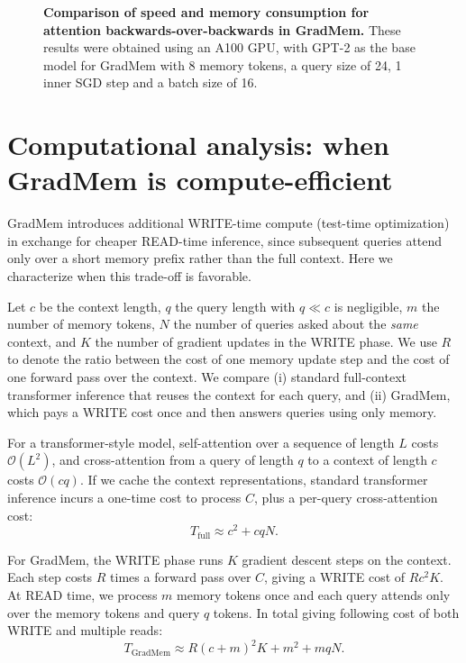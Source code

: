 \documentclass{article}
\theoremstyle{plain}
\theoremstyle{definition}
\theoremstyle{remark}
\begin{document}
{\begin{figure}[htbp!]
  \caption{\textbf{Comparison of speed and memory consumption for attention backwards-over-backwards in GradMem.} These results were obtained using an A100 GPU, with GPT-2 as the base model for GradMem with 8 memory tokens, a query size of 24, 1 inner SGD step and a batch size of 16.}
  \label{fig:gradmem_sdpa}
\end{figure}

\section{Computational analysis: when GradMem is compute-efficient}
\label{sec:compute_analysis}

GradMem introduces additional WRITE-time compute (test-time optimization) in exchange for cheaper READ-time inference, since subsequent queries attend only over a short memory prefix rather than the full context.
Here we characterize when this trade-off is favorable.

Let $c$ be the context length, $q$ the query length with $q \ll c$ is negligible, $m$ the number of memory tokens, $N$ the number of queries asked about the \emph{same} context, and $K$ the number of gradient updates in the WRITE phase.
We use $R$ to denote the ratio between the cost of one memory update step and the cost of one forward pass over the context. We compare (i) standard full-context transformer inference that reuses the context for each query, and (ii) GradMem, which pays a WRITE cost once and then answers queries using only memory.

For a transformer-style model, self-attention over a sequence of length $L$ costs $\mathcal{O}(L^2)$, and cross-attention from a query of length $q$ to a context of length $c$ costs $\mathcal{O}(cq)$.
If we cache the context representations, standard transformer inference incurs a one-time cost to process $C$, plus a per-query cross-attention cost:
\begin{equation}
    T_{\text{full}} \approx c^2  +c q N.
\end{equation}

For GradMem, the WRITE phase runs $K$ gradient descent steps on the context.
Each step costs $R$ times a forward pass over $C$, giving a WRITE cost of $R c^2 K$.
At READ time, we process $m$ memory tokens once and each query attends only over the memory tokens and query $q$ tokens. In total giving following cost of both WRITE and multiple reads:
\begin{equation}
    T_{\text{GradMem}} \approx R (c+m)^2 K + m^2 + m q N.
\end{equation}

}
\end{document}
